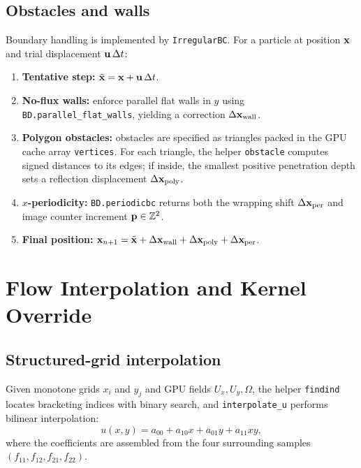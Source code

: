 \documentclass[11pt]{article}
\begin{document}
\subsection{Obstacles and walls}
Boundary handling is implemented by \texttt{IrregularBC}. For a particle at position $\vb{x}$ and trial displacement $\vb{u}\,\Delta t$:
\begin{enumerate}[leftmargin=*]
  \item \textbf{Tentative step:} $\tilde{\vb{x}} = \vb{x} + \vb{u}\,\Delta t$.
  \item \textbf{No-flux walls:} enforce parallel flat walls in $y$ using \texttt{BD.parallel\_flat\_walls}, yielding a correction $\Delta\vb{x}_{\text{wall}}$.
  \item \textbf{Polygon obstacles:} obstacles are specified as triangles packed in the GPU cache array \texttt{vertices}. For each triangle, the helper \texttt{obstacle} computes signed distances to its edges; if inside, the smallest positive penetration depth sets a reflection displacement $\Delta\vb{x}_{\text{poly}}$.
  \item \textbf{$x$-periodicity:} \texttt{BD.periodicbc} returns both the wrapping shift $\Delta\vb{x}_{\text{per}}$ and image counter increment \(\vb{p}\in\mathbb{Z}^2\).
  \item \textbf{Final position:} $\vb{x}_{n+1}= \tilde{\vb{x}} + \Delta\vb{x}_{\text{wall}} + \Delta\vb{x}_{\text{poly}} + \Delta\vb{x}_{\text{per}}$.
\end{enumerate}

\section{Flow Interpolation and Kernel Override}
\subsection{Structured-grid interpolation}
Given monotone grids $x_{i}$ and $y_{j}$ and GPU fields $U_x,U_y,\Omega$, the helper \texttt{findind} locates bracketing indices with binary search, and \texttt{interpolate\_u} performs bilinear interpolation:
\begin{equation}
  u(x,y) = a_{00} + a_{10} x + a_{01} y + a_{11} xy,
\end{equation}
where the coefficients are assembled from the four surrounding samples $(f_{11},f_{12},f_{21},f_{22})$.
\end{document}
